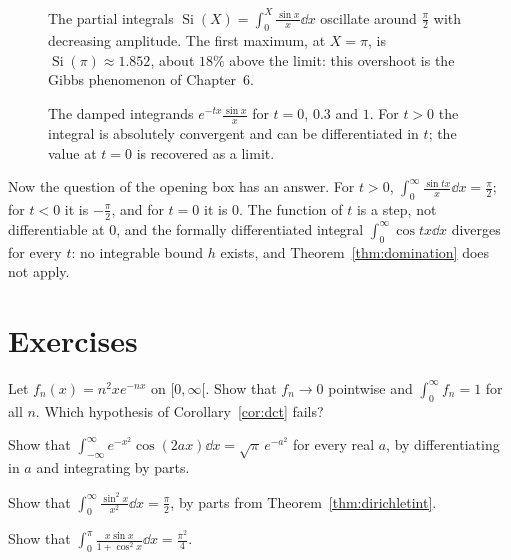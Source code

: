 \begin{figure}[ht]
\centering
{}
\caption{The partial integrals $\operatorname{Si}(X)=\int_0^X\frac{\sin x}x\dd x$ oscillate around $\frac\pi2$ with decreasing amplitude. The
first maximum, at $X=\pi$, is $\operatorname{Si}(\pi)\approx1.852$, about $18\%$ above the limit: this overshoot is the Gibbs phenomenon
of Chapter~6.}
\label{fig:si}
\end{figure}

\begin{figure}[ht]
\centering
{}
\caption{The damped integrands $e^{-tx}\frac{\sin x}x$ for $t=0$, $0.3$ and $1$. For $t>0$ the integral is absolutely convergent and can
be differentiated in $t$; the value at $t=0$ is recovered as a limit.}
\label{fig:damped}
\end{figure}

Now the question of the opening box has an answer. For $t>0$, $\int_0^\infty\frac{\sin tx}x\dd x=\frac\pi2$; for $t<0$ it is $-\frac\pi2$,
and for $t=0$ it is $0$. The function of $t$ is a step, not differentiable at $0$, and the formally differentiated integral
$\int_0^\infty\cos tx\dd x$ diverges for every $t$: no integrable bound $h$ exists, and Theorem~\ref{thm:domination} does not apply.

\section{Exercises}

\begin{exercise}[$\star$]\label{ex:swapfail}
Let $f_n(x)=n^2xe^{-nx}$ on $[0,\infty[$. Show that $f_n\to0$ pointwise and $\int_0^\infty f_n=1$ for all $n$. Which hypothesis of
Corollary~\ref{cor:dct} fails?
\end{exercise}

\begin{exercise}[$\star$]\label{ex:gausscos}
Show that $\int_{-\infty}^\infty e^{-x^2}\cos(2ax)\dd x=\sqrt\pi\,e^{-a^2}$ for every real $a$, by differentiating in $a$ and integrating by
parts.
\end{exercise}

\begin{exercise}[$\star$]\label{ex:sin2}
Show that $\int_0^\infty\frac{\sin^2x}{x^2}\dd x=\frac\pi2$, by parts from Theorem~\ref{thm:dirichletint}.
\end{exercise}

\begin{exercise}[$\star\star$]\label{ex:xsinx}
Show that $\int_0^\pi\frac{x\sin x}{1+\cos^2x}\dd x=\frac{\pi^2}4$.
\end{exercise}

